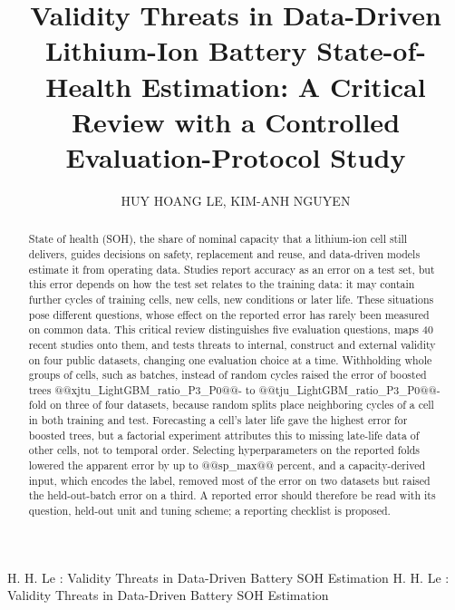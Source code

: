 \documentclass{ieeeaccess}
\let\ieeeyearsaved\year\mathchardef\year=2026
\let\year\ieeeyearsaved
\begin{document}

\title{Validity Threats in Data-Driven Lithium-Ion Battery State-of-Health Estimation: A Critical Review with a Controlled Evaluation-Protocol Study}
\author{\uppercase{Huy Hoang Le}, \uppercase{Kim-Anh Nguyen}}
\address[1]{[Affiliation of H. H. Le, country] (e-mail: lhhoang@powermore.vn)}
\address[2]{[Affiliation of K.-A. Nguyen, country] (e-mail: [email])}
\markboth
{H. H. Le \headeretal: Validity Threats in Data-Driven Battery SOH Estimation}
{H. H. Le \headeretal: Validity Threats in Data-Driven Battery SOH Estimation}

\begin{abstract}
State of health (SOH), the share of nominal capacity that a lithium-ion cell still delivers, guides decisions on safety, replacement and reuse, and data-driven models estimate it from operating data. Studies report accuracy as an error on a test set, but this error depends on how the test set relates to the training data: it may contain further cycles of training cells, new cells, new conditions or later life. These situations pose different questions, whose effect on the reported error has rarely been measured on common data. This critical review distinguishes five evaluation questions, maps 40 recent studies onto them, and tests threats to internal, construct and external validity on four public datasets, changing one evaluation choice at a time. Withholding whole groups of cells, such as batches, instead of random cycles raised the error of boosted trees @@xjtu_LightGBM_ratio_P3_P0@@- to @@tju_LightGBM_ratio_P3_P0@@-fold on three of four datasets, because random splits place neighboring cycles of a cell in both training and test. Forecasting a cell's later life gave the highest error for boosted trees, but a factorial experiment attributes this to missing late-life data of other cells, not to temporal order. Selecting hyperparameters on the reported folds lowered the apparent error by up to @@sp_max@@ percent, and a capacity-derived input, which encodes the label, removed most of the error on two datasets but raised the held-out-batch error on a third. A reported error should therefore be read with its question, held-out unit and tuning scheme; a reporting checklist is proposed.
\end{abstract}
\end{document}

